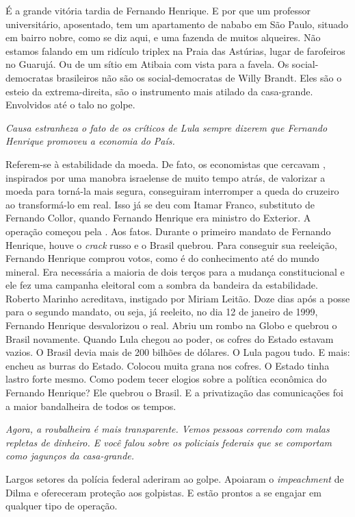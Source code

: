 \normalfont
É a grande vitória tardia de Fernando Henrique. E por que
um professor universitário, aposentado, tem um apartamento de nababo em
São Paulo, situado em bairro nobre, como se diz aqui, e uma fazenda de
muitos alqueires. Não estamos falando em um ridículo triplex na Praia
das Astúrias, lugar de farofeiros no Guarujá. Ou de um sítio em Atibaia
com vista para a favela. Os social-democratas brasileiros não são os
social-democratas de Willy Brandt. Eles são o esteio da extrema-direita,
são o instrumento mais atilado da casa-grande. Envolvidos até o talo no
golpe.

\itshape
 Causa estranheza o fato de os críticos de Lula sempre
dizerem que Fernando Henrique promoveu a economia do País.

\normalfont
Referem-se à estabilidade da moeda. De fato, os
economistas que cercavam , inspirados por uma manobra israelense de
muito tempo atrás, de valorizar a moeda para torná-la mais segura,
conseguiram interromper a queda do cruzeiro ao transformá-lo em real.
Isso já se deu com Itamar Franco, substituto de Fernando Collor, quando
Fernando Henrique era ministro do Exterior. A operação começou pela .
Aos fatos. Durante o primeiro mandato de Fernando Henrique, houve o
\emph{crack} russo e o Brasil quebrou. Para conseguir sua reeleição,
Fernando Henrique comprou votos, como é do conhecimento até do mundo
mineral. Era necessária a maioria de dois terços para a mudança
constitucional e ele fez uma campanha eleitoral com a sombra da bandeira
da estabilidade. Roberto Marinho acreditava, instigado por Miriam
Leitão. Doze dias após a posse para o segundo mandato, ou seja, já
reeleito, no dia 12 de janeiro de 1999, Fernando Henrique desvalorizou o
real. Abriu um rombo na Globo e quebrou o Brasil novamente. Quando Lula
chegou ao poder, os cofres do Estado estavam vazios. O Brasil devia mais
de 200 bilhões de dólares. O Lula pagou tudo. E mais: encheu as burras
do Estado. Colocou muita grana nos cofres. O Estado tinha lastro forte
mesmo. Como podem tecer elogios sobre a política econômica do Fernando
Henrique? Ele quebrou o Brasil. E a privatização das comunicações foi a
maior bandalheira de todos os tempos.

\itshape
 Agora, a roubalheira é mais transparente. Vemos pessoas
correndo com malas repletas de dinheiro. E você falou sobre os policiais
federais que se comportam como jagunços da casa-grande.

\normalfont
Largos setores da polícia federal aderiram ao golpe.
Apoiaram o \emph{impeachment} de Dilma e ofereceram proteção aos
golpistas. E estão prontos a se engajar em qualquer tipo de operação.

